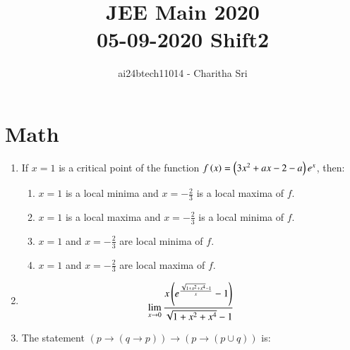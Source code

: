 \documentclass[journal,12pt,onecolumn]{IEEEtran}
\theoremstyle{remark}
\begin{document}

\vspace{3cm}

\title{JEE Main 2020 \\ 05-09-2020 Shift2}
\author{ai24btech11014 - Charitha Sri}

\maketitle
\bigskip       
\renewcommand{\thefigure}{\theenumi}
\renewcommand{\thetable}{\theenumi}



\section{Math}                                                      
\begin{enumerate}                     
\item If $x=1$ is a critical point of the function $f\left(x\right) = \left(3x^{2}+ax-2-a\right)e^{x}$, then:        
\begin{enumerate}                            
\item $x=1$ is a local minima and $x = -\frac{2}{3}$ is a local maxima of $f$.          
\item $x=1$ is a local maxima and $x=-\frac{2}{3}$ is a local minima of $f$.            
\item $x=1$ and $x=-\frac{2}{3}$ are local minima of $f$.           
\item $x=1$ and $x=-\frac{2}{3}$ are local maxima of $f$.       
\end{enumerate}
\item
	  \begin{align}
		  \lim_{x \to 0}\frac{x\left({e}^{\frac{\sqrt{1+x^{2}+x^{4}} - 1}{x}} -1 \right)}{\sqrt{1+x^{2}+x^{4}} - 1}
	  \end{align}
\begin{enumerate}
  \end{enumerate}
 \item The statement $(p \rightarrow (q \rightarrow p)) \rightarrow (p \rightarrow (p \cup q))$ is:
  \begin{enumerate}

\end{enumerate}
\end{enumerate}
\end{document}

